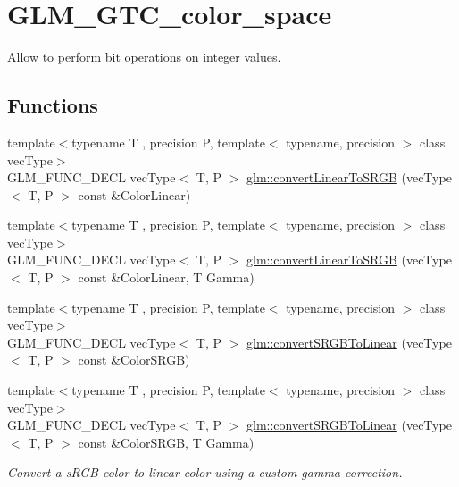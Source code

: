 \hypertarget{group__gtc__color__space}{}\section{G\+L\+M\+\_\+\+G\+T\+C\+\_\+color\+\_\+space}
\label{group__gtc__color__space}


Allow to perform bit operations on integer values.  


\subsection*{Functions}
\begin{DoxyCompactItemize}
\item 
{\footnotesize template$<$typename T , precision P, template$<$ typename, precision $>$ class vec\+Type$>$ }\\G\+L\+M\+\_\+\+F\+U\+N\+C\+\_\+\+D\+E\+CL vec\+Type$<$ T, P $>$ \hyperlink{group__gtc__color__space_gad813dcd99644cafc775e83d6504ccb93}{glm\+::convert\+Linear\+To\+S\+R\+GB} (vec\+Type$<$ T, P $>$ const \&Color\+Linear)
\item 
{\footnotesize template$<$typename T , precision P, template$<$ typename, precision $>$ class vec\+Type$>$ }\\G\+L\+M\+\_\+\+F\+U\+N\+C\+\_\+\+D\+E\+CL vec\+Type$<$ T, P $>$ \hyperlink{group__gtc__color__space_ga63f8b003da7acf44370eb47bfb8b3d42}{glm\+::convert\+Linear\+To\+S\+R\+GB} (vec\+Type$<$ T, P $>$ const \&Color\+Linear, T Gamma)
\item 
{\footnotesize template$<$typename T , precision P, template$<$ typename, precision $>$ class vec\+Type$>$ }\\G\+L\+M\+\_\+\+F\+U\+N\+C\+\_\+\+D\+E\+CL vec\+Type$<$ T, P $>$ \hyperlink{group__gtc__color__space_ga28e98e64347cf385cadc1ceb4def55c9}{glm\+::convert\+S\+R\+G\+B\+To\+Linear} (vec\+Type$<$ T, P $>$ const \&Color\+S\+R\+GB)
\item 
\mbox{\label{group__gtc__color__space_ga61c4f0efdf55c29d9cfbd26141fddef8}} 
{\footnotesize template$<$typename T , precision P, template$<$ typename, precision $>$ class vec\+Type$>$ }\\G\+L\+M\+\_\+\+F\+U\+N\+C\+\_\+\+D\+E\+CL vec\+Type$<$ T, P $>$ \hyperlink{group__gtc__color__space_ga61c4f0efdf55c29d9cfbd26141fddef8}{glm\+::convert\+S\+R\+G\+B\+To\+Linear} (vec\+Type$<$ T, P $>$ const \&Color\+S\+R\+GB, T Gamma)
\begin{DoxyCompactList}\small\item\em Convert a s\+R\+GB color to linear color using a custom gamma correction. \end{DoxyCompactList}\end{DoxyCompactItemize}


